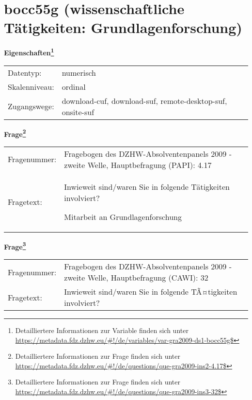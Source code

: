 
    \setcounter{footnote}{0}

    \vspace*{-1.8cm}
	\section{bocc55g (wissenschaftliche Tätigkeiten: Grundlagenforschung)}
	\label{section:bocc55g}



    \vspace*{0.5cm}
    \noindent\textbf{Eigenschaften\footnote{Detailliertere Informationen zur Variable finden sich unter
		\url{https://metadata.fdz.dzhw.eu/\#!/de/variables/var-gra2009-ds1-bocc55g$}}}\\
	\begin{tabularx}{\hsize}{@{}lX}
	Datentyp: & numerisch \\
	Skalenniveau: & ordinal \\
	Zugangswege: &
	  download-cuf, 
	  download-suf, 
	  remote-desktop-suf, 
	  onsite-suf
 \\
    \end{tabularx}



				\vspace*{0.5cm}
                \noindent\textbf{Frage\footnote{Detailliertere Informationen zur Frage finden sich unter
		              \url{https://metadata.fdz.dzhw.eu/\#!/de/questions/que-gra2009-ins2-4.17$}}}\\
				\begin{tabularx}{\hsize}{@{}lX}
					Fragenummer: &
					  Fragebogen des DZHW-Absolventenpanels 2009 - zweite Welle, Hauptbefragung (PAPI):
					  4.17
 \\
					Fragetext: & Inwieweit sind/waren Sie in folgende Tätigkeiten involviert?\par  Mitarbeit an Grundlagenforschung \\
				\end{tabularx}
				\vspace*{0.5cm}
                \noindent\textbf{Frage\footnote{Detailliertere Informationen zur Frage finden sich unter
		              \url{https://metadata.fdz.dzhw.eu/\#!/de/questions/que-gra2009-ins3-32$}}}\\
				\begin{tabularx}{\hsize}{@{}lX}
					Fragenummer: &
					  Fragebogen des DZHW-Absolventenpanels 2009 - zweite Welle, Hauptbefragung (CAWI):
					  32
 \\
					Fragetext: & Inwieweit sind/waren Sie in folgende TÃ¤tigkeiten involviert? \\
				\end{tabularx}





